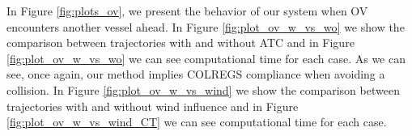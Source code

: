         
        In Figure \ref{fig:plots_ov}, we present the behavior of our system when \ac{OV} encounters another vessel ahead.  %
        In Figure \ref{fig:plot_ov_w_vs_wo} we show the comparison between trajectories with and without ATC and in Figure \ref{fig:plot_ov_w_vs_wo} we can see computational time for each case. As we can see, once again, our method implies COLREGS compliance when avoiding a collision. In Figure \ref{fig:plot_ov_w_vs_wind} we show the comparison between trajectories with and without wind influence and in Figure \ref{fig:plot_ov_w_vs_wind_CT} we can see computational time for each case. 
